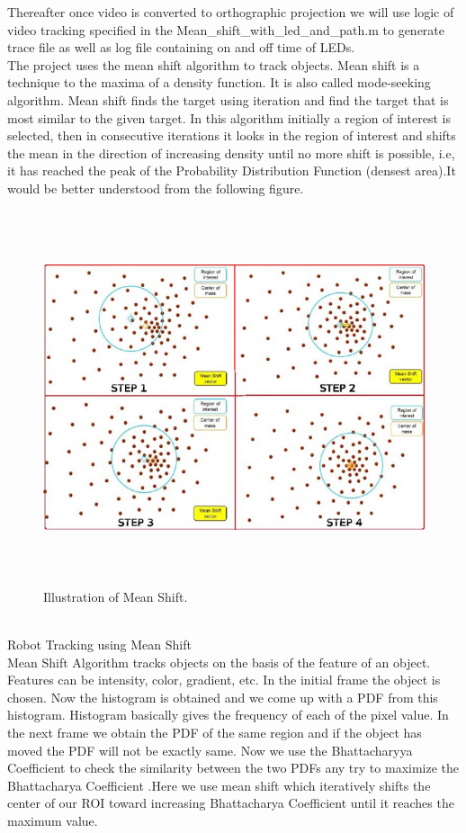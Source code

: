 \documentclass[a4paper,12pt,oneside]{book}
\begin{document}
Thereafter once video is converted to orthographic projection we will use logic of video tracking specified in the  Mean\_shift\_with\_led\_and\_path.m to generate trace file as well as log file containing on and off time of LEDs.\\
The project uses the mean shift algorithm to track objects.
Mean shift is a technique to the maxima of a density function. It is also called mode-seeking algorithm.
Mean shift finds the target using iteration and find the target that is most similar to the given target. 
In this algorithm initially a region of interest is selected, then in consecutive iterations it looks in the region of interest and shifts the mean in the direction of increasing density until no more shift is possible, i.e, it has reached the peak of the Probability Distribution Function (densest area).It would be better understood from the following figure.
    \begin{figure}[h!]
		\includegraphics[width=1\linewidth, height=11cm]{ROI.jpg}
		\centering
		\caption{Illustration of Mean Shift.}
	\end{figure}\\
Robot Tracking using Mean Shift\\
Mean Shift Algorithm tracks objects on the basis of the feature of an object. Features can be intensity, color, gradient, etc. In the initial frame the object is chosen. Now the histogram is obtained and we come up with a PDF from this histogram. Histogram basically gives the frequency of each of the pixel value. In the next frame we obtain the PDF of the same region and if the object has moved the PDF will not be exactly same. Now we use the Bhattacharyya Coefficient to check the similarity between the two PDFs any try to maximize the Bhattacharya Coefficient .Here we use mean shift which iteratively shifts the center of our ROI toward increasing Bhattacharya Coefficient until it reaches the maximum value. 
\end{document}

